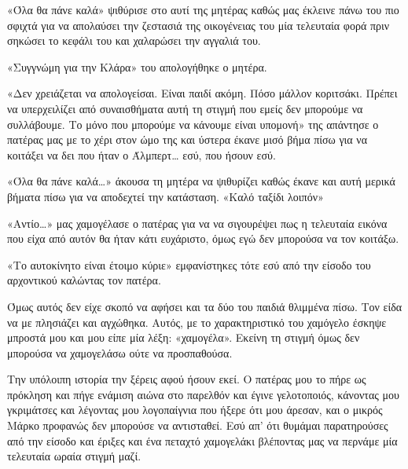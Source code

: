 \documentclass[12pt,twoside, openany]{book}
\begin{document}
«Όλα θα πάνε καλά» ψιθύρισε στο αυτί της μητέρας καθώς μας έκλεινε πάνω του πιο σφιχτά για να απολαύσει την ζεστασιά της οικογένειας του μία τελευταία φορά πριν σηκώσει το κεφάλι του και χαλαρώσει την αγγαλιά του.

«Συγγνώμη για την Κλάρα» του απολογήθηκε ο μητέρα.

«Δεν χρειάζεται να απολογείσαι. Είναι παιδί ακόμη. Πόσο μάλλον κοριτσάκι. Πρέπει να υπερχειλίζει από συναισθήματα αυτή τη στιγμή που εμείς δεν μπορούμε να συλλάβουμε. Το μόνο που μπορούμε να κάνουμε είναι υπομονή» της απάντησε ο πατέρας μας με το χέρι στον ώμο της και ύστερα έκανε μισό βήμα πίσω για να κοιτάξει να δει που ήταν ο Άλμπερτ… εσύ, που ήσουν εσύ. 

«Όλα θα πάνε καλά…» άκουσα τη μητέρα να ψιθυρίζει καθώς έκανε και αυτή μερικά βήματα πίσω για να αποδεχτεί την κατάσταση. «Καλό ταξίδι λοιπόν»

«Αντίο…» μας χαμογέλασε ο πατέρας για να να σιγουρέψει πως η τελευταία εικόνα που είχα από αυτόν θα ήταν κάτι ευχάριστο, όμως εγώ δεν μπορούσα να τον κοιτάξω.

«Το αυτοκίνητο είναι έτοιμο κύριε» εμφανίστηκες τότε εσύ από την είσοδο του αρχοντικού καλώντας τον πατέρα. 

Όμως αυτός δεν είχε σκοπό να αφήσει και τα δύο του παιδιά θλιμμένα πίσω. Τον είδα να με πλησιάζει και αγχώθηκα. Αυτός, με το χαρακτηριστικό του χαμόγελο έσκηψε μπροστά μου και μου είπε μία λέξη: «χαμογέλα». Εκείνη τη στιγμή όμως δεν μπορούσα να χαμογελάσω ούτε να προσπαθούσα. 

Την υπόλοιπη ιστορία την ξέρεις αφού ήσουν εκεί. Ο πατέρας μου το πήρε ως πρόκληση και πήγε ενάμιση αιώνα στο παρελθόν και έγινε γελοτοποιός, κάνοντας μου γκριμάτσες και λέγοντας μου λογοπαίγνια που ήξερε ότι μου άρεσαν, και ο μικρός Μάρκο προφανώς δεν μπορούσε να αντισταθεί. Εσύ απ’ ότι θυμάμαι παρατηρούσες από την είσοδο και έριξες και ένα πεταχτό χαμογελάκι βλέποντας μας να περνάμε μία τελευταία ωραία στιγμή μαζί.
\end{document}
